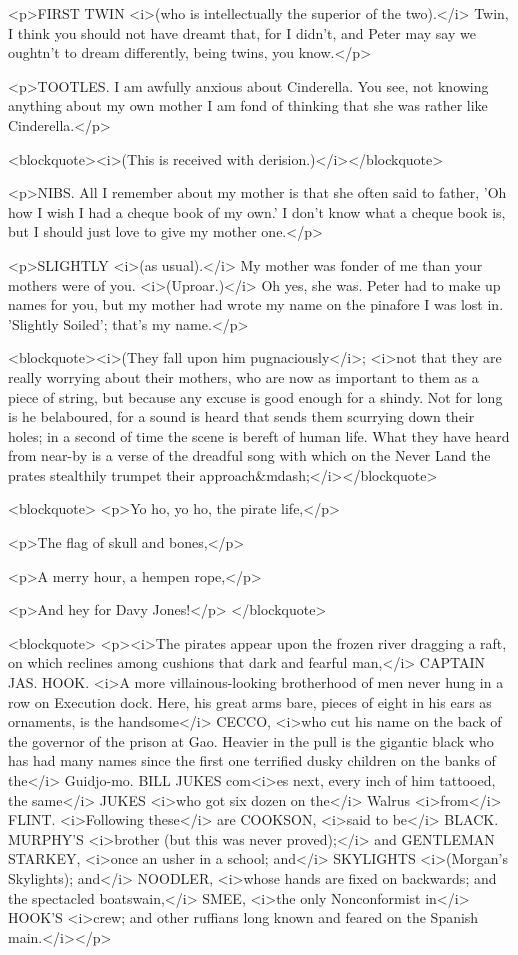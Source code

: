 <p>FIRST TWIN <i>(who is intellectually the superior of the two).</i> Twin, I think you should not have dreamt that, for I didn't, and Peter may say we oughtn't to dream differently, being twins, you know.</p>

<p>TOOTLES. I am awfully anxious about Cinderella. You see, not knowing anything about my own mother I am fond of thinking that she was rather like Cinderella.</p>

<blockquote><i>(This is received with derision.)</i></blockquote>

<p>NIBS. All I remember about my mother is that she often said to father, 'Oh how I wish I had a cheque book of my own.' I don't know what a cheque book is, but I should just love to give my mother one.</p>

<p>SLIGHTLY <i>(as usual).</i> My mother was fonder of me than your mothers were of you. <i>(Uproar.)</i> Oh yes, she was. Peter had to make up names for you, but my mother had wrote my name on the pinafore I was lost in. 'Slightly Soiled'; that's my name.</p>

<blockquote><i>(They fall upon him pugnaciously</i>; <i>not that they are really worrying about their mothers, who are now as important to them as a piece of string, but because any excuse is good enough for a shindy. Not for long is he belaboured, for a sound is heard that sends them scurrying down their holes; in a second of time the scene is bereft of human life. What they have heard from near-by is a verse of the dreadful song with which on the Never Land the prates stealthily trumpet their approach&mdash;</i></blockquote>

<blockquote> <p>Yo ho, yo ho, the pirate life,</p>

<p>The flag of skull and bones,</p>

<p>A merry hour, a hempen rope,</p>

<p>And hey for Davy Jones!</p> </blockquote>

<blockquote> <p><i>The pirates appear upon the frozen river dragging a raft, on which reclines among cushions that dark and fearful man,</i> CAPTAIN JAS. HOOK. <i>A more villainous-looking brotherhood of men never hung in a row on Execution dock. Here, his great arms bare, pieces of eight in his ears as ornaments, is the handsome</i> CECCO, <i>who cut his name on the back of the governor of the prison at Gao. Heavier in the pull is the gigantic black who has had many names since the first one terrified dusky children on the banks of the</i> Guidjo-mo. BILL JUKES com<i>es next, every inch of him tattooed, the same</i> JUKES <i>who got six dozen on the</i> Walrus <i>from</i> FLINT. <i>Following these</i> are COOKSON, <i>said to be</i> BLACK. MURPHY'S <i>brother (but this was never proved);</i> and GENTLEMAN STARKEY, <i>once an usher in a school; and</i> SKYLIGHTS <i>(Morgan's Skylights); and</i> NOODLER, <i>whose hands are fixed on backwards; and the spectacled boatswain,</i> SMEE, <i>the only Nonconformist in</i> HOOK'S <i>crew; and other ruffians long known and feared on the Spanish main.</i></p>

